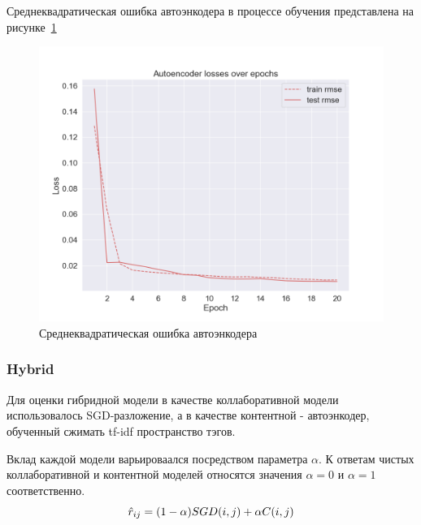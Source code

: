 Среднеквадратическая ошибка автоэнкодера в процессе обучения представлена на рисунке~\ref{fig:autoencoder_losses}

\begin{figure}[h!]
\centering
\begin{minipage}{0.6\textwidth}
\centering
\includegraphics[width=0.9\linewidth]{images/content/autoencoder_losses}
\caption{Среднеквадратическая ошибка автоэнкодера}
\label{fig:autoencoder_losses}
\end{minipage}%
\end{figure}

\pagebreak

\subsubsection{Hybrid}
Для оценки гибридной модели в качестве коллаборативной модели использовалось SGD-разложение, а в качестве контентной - автоэнкодер, обученный сжимать tf-idf пространство тэгов.

Вклад каждой модели варьироваался посредством параметра $\alpha$.
К ответам чистых коллаборативной и контентной моделей относятся значения $\alpha = 0$ и $\alpha = 1$ соответственно.
\begin{equation}\label{eq:hybrid_filtering}
\hat{r}_{ij} = (1 - \alpha)\space SGD(i, j) + \alpha\space C(i, j)
\end{equation}

